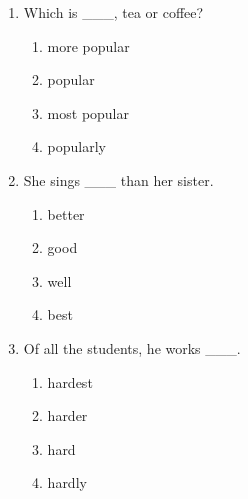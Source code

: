 \documentclass[11pt,a4paper]{ctexart}
\begin{document}
\begin{enumerate}[leftmargin=*,itemsep=4pt]
\begin{enumerate}[label=\Alph*.,leftmargin=2em,itemsep=1pt,topsep=2pt]
\item largely
\end{enumerate}
\item Which is \_\_\_, tea or coffee?
\begin{enumerate}[label=\Alph*.,leftmargin=2em,itemsep=1pt,topsep=2pt]
\item more popular
\item popular
\item most popular
\item popularly
\end{enumerate}
\item She sings \_\_\_ than her sister.
\begin{enumerate}[label=\Alph*.,leftmargin=2em,itemsep=1pt,topsep=2pt]
\item better
\item good
\item well
\item best
\end{enumerate}
\item Of all the students, he works \_\_\_.
\begin{enumerate}[label=\Alph*.,leftmargin=2em,itemsep=1pt,topsep=2pt]
\item hardest
\item harder
\item hard
\item hardly
\end{enumerate}
\end{enumerate}

\newpage
\end{document}
